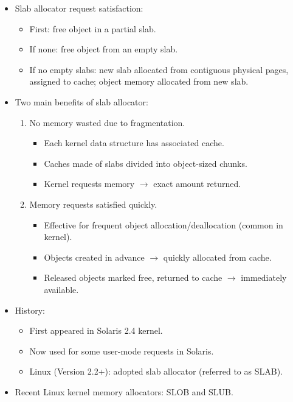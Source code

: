 \begin{itemize}
\begin{enumerate}
    \end{enumerate}
    \item Slab allocator request satisfaction:
    \begin{itemize}
        \item First: free object in a partial slab.
        \item If none: free object from an empty slab.
        \item If no empty slabs: new slab allocated from contiguous physical pages, assigned to cache; object memory allocated from new slab.
    \end{itemize}
    \item Two main benefits of slab allocator:
    \begin{enumerate}
        \item No memory wasted due to fragmentation.
        \begin{itemize}
            \item Each kernel data structure has associated cache.
            \item Caches made of slabs divided into object-sized chunks.
            \item Kernel requests memory $\rightarrow$ exact amount returned.
        \end{itemize}
        \item Memory requests satisfied quickly.
        \begin{itemize}
            \item Effective for frequent object allocation/deallocation (common in kernel).
            \item Objects created in advance $\rightarrow$ quickly allocated from cache.
            \item Released objects marked free, returned to cache $\rightarrow$ immediately available.
        \end{itemize}
    \end{enumerate}
    \item History:
    \begin{itemize}
        \item First appeared in Solaris 2.4 kernel.
        \item Now used for some user-mode requests in Solaris.
        \item Linux (Version 2.2+): adopted slab allocator (referred to as SLAB).
    \end{itemize}
    \item Recent Linux kernel memory allocators: SLOB and SLUB.

\end{itemize}
